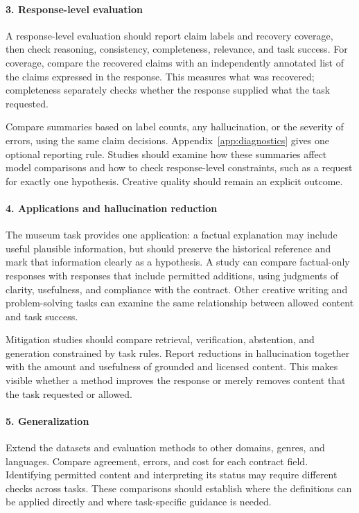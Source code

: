 \documentclass{clv2025}
\begin{document}
\paragraph{3. Response-level evaluation}
A response-level evaluation should report claim labels and recovery coverage,
then check reasoning, consistency, completeness, relevance, and task success.
For coverage, compare the recovered claims with an independently annotated
list of the claims expressed in the response. This measures what was recovered;
completeness separately checks whether the response supplied what the task
requested.

Compare summaries based on label counts, any hallucination, or the severity
of errors, using the same claim decisions. Appendix~\ref{app:diagnostics}
gives one optional reporting rule. Studies should examine how these summaries
affect model comparisons and how to check response-level constraints, such
as a request for exactly one hypothesis. Creative quality should
remain an explicit outcome.

\paragraph{4. Applications and hallucination reduction}
The museum task provides one application: a factual explanation may include
useful plausible information, but should preserve the historical reference
and mark that information clearly as a hypothesis. A study can compare factual-only responses
with responses that include permitted additions, using judgments of clarity,
usefulness, and compliance with the contract. Other creative writing and
problem-solving tasks can examine the same relationship between allowed
content and task success.

Mitigation studies should compare retrieval, verification, abstention, and
generation constrained by task rules. Report reductions in hallucination
together with the amount and usefulness of grounded and licensed content.
This makes visible whether a method improves the response or merely removes
content that the task requested or allowed.

\paragraph{5. Generalization}
Extend the datasets and evaluation methods to other domains, genres, and
languages. Compare agreement, errors, and cost for each contract field.
Identifying permitted content and interpreting its status may require
different checks across tasks. These comparisons should establish where
the definitions can be applied directly and where task-specific guidance
is needed.
\end{document}
